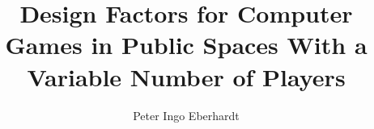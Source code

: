 \documentclass[bachelor,english,smartquotes,proposal]{hgbthesis}
\begin{document}


\title{Design Factors for Computer Games in Public Spaces With a Variable Number of Players}
\author{Peter Ingo Eberhardt}




\frontmatter                                   %

\maketitle
\tableofcontents

		
			

\mainmatter                                    %



\MakeBibliography                                                 %

\end{document}
